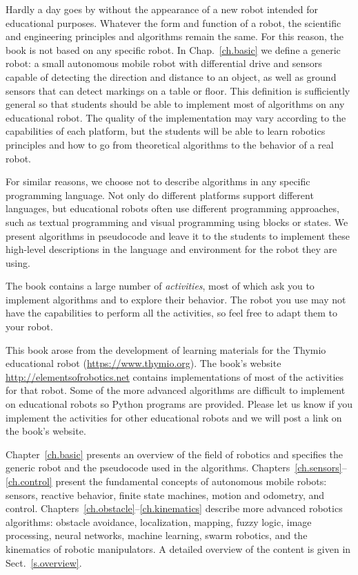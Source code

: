 Hardly a day goes by without the appearance of a new robot intended for educational purposes. Whatever the form and function of a robot, the scientific and engineering principles and algorithms remain the same. For this reason, the  book is not based on any specific robot. In Chap.~\ref{ch.basic} we define a generic robot: a small autonomous mobile robot with differential drive and sensors capable of detecting the direction and distance to an object, as well as ground sensors that can detect markings on a table or floor. This definition is sufficiently general so that students should be able to implement most of algorithms on any educational robot. The quality of the implementation may vary according to the capabilities of each platform, but the students will be able to learn robotics principles and how to go from theoretical algorithms to the behavior of a real robot.

For similar reasons, we choose not to describe algorithms in any specific programming language. Not only do different platforms support different languages, but educational robots often use different programming approaches, such as textual programming and visual programming using blocks or states. We present algorithms in pseudocode and leave it to the students to implement these high-level descriptions in the language and environment for the robot they are using.

The book contains a large number of \emph{activities}, most of which ask you to implement algorithms and to explore their behavior. The robot you use may not have the capabilities to perform all the activities, so feel free to adapt them to your robot.

This book arose from the development of learning materials for the Thymio educational robot (\url{https://www.thymio.org}). The book's website \url{http://elementsofrobotics.net} contains implementations of most of the activities for that robot. Some of the more advanced algorithms are difficult to implement on educational robots so Python programs are provided. Please let us know if you implement the activities for other educational robots and we will post a link on the book's website.

Chapter~\ref{ch.basic} presents an overview of the field of robotics and specifies the  generic robot and the pseudocode used in the algorithms. Chapters~\ref{ch.sensors}--\ref{ch.control} present the fundamental concepts of autonomous mobile robots: sensors, reactive behavior, finite state machines, motion and odometry, and control. Chapters~\ref{ch.obstacle}--\ref{ch.kinematics} describe more advanced robotics algorithms: obstacle avoidance, localization, mapping, fuzzy logic, image processing, neural networks, machine learning, swarm robotics, and the kinematics of robotic manipulators. A detailed overview of the content is given in Sect.~\ref{s.overview}.

